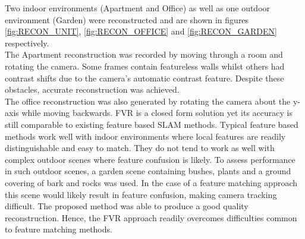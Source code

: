 Two indoor environments (Apartment and Office) as well as one outdoor environment (Garden) were reconstructed and are shown in figures \ref{fig:RECON_UNIT}, \ref{fig:RECON_OFFICE} and \ref{fig:RECON_GARDEN} respectively. \\

The Apartment reconstruction was recorded by moving through a room and rotating the camera. Some frames contain featureless walls whilst others had contrast shifts due to the camera's automatic contrast feature. Despite these obstacles, accurate reconstruction was achieved. \\

The office reconstruction was also generated by rotating the camera about the y-axis while moving backwards. FVR is a closed form solution yet its accuracy is still comparable to existing feature based SLAM methods. Typical feature based methods work well with indoor environments where local features are readily distinguishable and easy to match. They do not tend to work as well with complex outdoor scenes where feature confusion is likely. To assess performance in such outdoor scenes, a garden scene containing bushes, plants and a ground covering of bark and rocks was used. In the case of a feature matching approach this scene would likely result in feature confusion, making camera tracking difficult. The proposed method was able to produce a good quality reconstruction. Hence, the FVR approach readily overcomes difficulties common to feature matching methods.   

